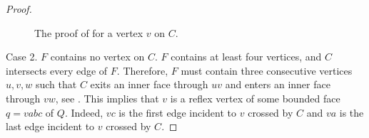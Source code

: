 \begin{proof}
  \begin{figure}
     \caption{The proof of  for a vertex
       $v$ on $C$.}
  \end{figure}
   
Case 2. $F$ contains no vertex on $C$.
$F$ contains at least four vertices, and $C$ intersects
   every edge of $F$.  Therefore,  
   $F$
    must contain three consecutive vertices
   $u,v,w$ such that $C$ exits an inner face through $uv$ and enters
   an inner face through $vw$, see .
  This implies that $v$ is a reflex vertex
   of some bounded face $q=vabc$ of $Q$.  Indeed, $vc$ is the first edge
   incident to $v$ crossed by $C$ and $va$ is the last edge incident to
   $v$ crossed by $C$.


\end{proof}
